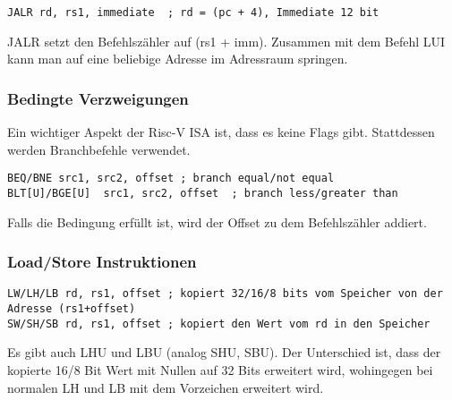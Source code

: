 \begin{lstlisting}[style=risc-v_Assembler]
JALR rd, rs1, immediate  ; rd = (pc + 4), Immediate 12 bit
\end{lstlisting}

JALR setzt den Befehlszähler auf (rs1 + imm). Zusammen mit dem Befehl LUI kann
man auf eine beliebige Adresse im Adressraum springen.

\subsubsection{Bedingte Verzweigungen}

Ein wichtiger Aspekt der Risc-V ISA ist, dass es keine Flags gibt. Stattdessen
werden Branchbefehle verwendet.

\begin{lstlisting}[style=risc-v_Assembler]
BEQ/BNE src1, src2, offset ; branch equal/not equal
BLT[U]/BGE[U]  src1, src2, offset  ; branch less/greater than
\end{lstlisting}

Falls die Bedingung erfüllt ist, wird der Offset zu dem Befehlszähler addiert.

\subsubsection{Load/Store Instruktionen}

\begin{lstlisting}[style=risc-v_Assembler]
LW/LH/LB rd, rs1, offset ; kopiert 32/16/8 bits vom Speicher von der Adresse (rs1+offset)
SW/SH/SB rd, rs1, offset ; kopiert den Wert vom rd in den Speicher
\end{lstlisting}

Es gibt auch LHU und LBU (analog SHU, SBU). Der Unterschied ist, dass der
kopierte 16/8 Bit Wert mit Nullen auf 32 Bits erweitert wird, wohingegen bei normalen LH
und LB mit dem Vorzeichen erweitert wird.
